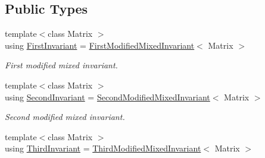 \subsection*{Public Types}
\begin{DoxyCompactItemize}
\item 
\hypertarget{structFunG_1_1LinearAlgebra_1_1InvariantTraits_3_01Invariant_1_1MODIFIED__MIXED_01_4_acfb5593eca2b54828b014947b568454c}{{\footnotesize template$<$class Matrix $>$ }\\using \hyperlink{structFunG_1_1LinearAlgebra_1_1InvariantTraits_3_01Invariant_1_1MODIFIED__MIXED_01_4_acfb5593eca2b54828b014947b568454c}{First\-Invariant} = \hyperlink{structFunG_1_1LinearAlgebra_1_1FirstModifiedMixedInvariant}{First\-Modified\-Mixed\-Invariant}$<$ Matrix $>$}\label{structFunG_1_1LinearAlgebra_1_1InvariantTraits_3_01Invariant_1_1MODIFIED__MIXED_01_4_acfb5593eca2b54828b014947b568454c}

\begin{DoxyCompactList}\small\item\em First modified mixed invariant. \end{DoxyCompactList}\item 
\hypertarget{structFunG_1_1LinearAlgebra_1_1InvariantTraits_3_01Invariant_1_1MODIFIED__MIXED_01_4_a6ad7e65e4bcc480ae38476beaed03c66}{{\footnotesize template$<$class Matrix $>$ }\\using \hyperlink{structFunG_1_1LinearAlgebra_1_1InvariantTraits_3_01Invariant_1_1MODIFIED__MIXED_01_4_a6ad7e65e4bcc480ae38476beaed03c66}{Second\-Invariant} = \hyperlink{structFunG_1_1LinearAlgebra_1_1SecondModifiedMixedInvariant}{Second\-Modified\-Mixed\-Invariant}$<$ Matrix $>$}\label{structFunG_1_1LinearAlgebra_1_1InvariantTraits_3_01Invariant_1_1MODIFIED__MIXED_01_4_a6ad7e65e4bcc480ae38476beaed03c66}

\begin{DoxyCompactList}\small\item\em Second modified mixed invariant. \end{DoxyCompactList}\item 
\hypertarget{structFunG_1_1LinearAlgebra_1_1InvariantTraits_3_01Invariant_1_1MODIFIED__MIXED_01_4_aecf17eef2785af8d79f3e6e33e2fa394}{{\footnotesize template$<$class Matrix $>$ }\\using \hyperlink{structFunG_1_1LinearAlgebra_1_1InvariantTraits_3_01Invariant_1_1MODIFIED__MIXED_01_4_aecf17eef2785af8d79f3e6e33e2fa394}{Third\-Invariant} = \hyperlink{structFunG_1_1LinearAlgebra_1_1ThirdModifiedMixedInvariant}{Third\-Modified\-Mixed\-Invariant}$<$ Matrix $>$}\label{structFunG_1_1LinearAlgebra_1_1InvariantTraits_3_01Invariant_1_1MODIFIED__MIXED_01_4_aecf17eef2785af8d79f3e6e33e2fa394}


\end{DoxyCompactItemize}
